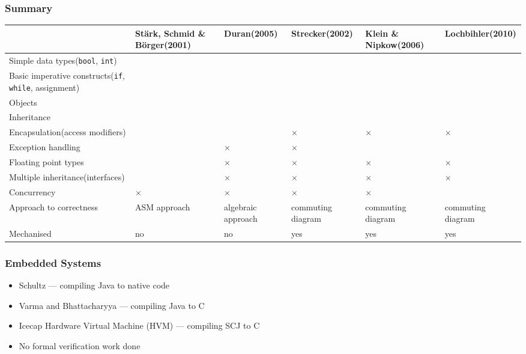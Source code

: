 \documentclass[usenames,dvipsnames,svgnames,table]{beamer}
\newcommand{\yes}{{\large \checkmark}}
\newcommand{\no}{{\large \color{red} $\times$}}
\newcommand{\footmake}[1]{
\ifthenelse{\equal{#1}{}}%
	{}%
	{\footnotetext{#1}}%
}
\newenvironment{slide}[2][fragile,environment=slide]
{\begin{frame}[#1]
	\frametitle{#2}\begin{refsegment}}
{\footmake{\printbibliography[segment=\therefsegment]}\end{refsegment}\end{frame}}
\begin{document}
\begin{frame}
  \frametitle{Summary}
  \tiny
  \begin{tabular}{p{2.6cm}| b{1.6cm} b{0.9cm} b{0.9cm} b{0.9cm} b{1cm}}
      & St\"{a}rk, Schmid \& B\"{o}rger\newline(2001) %
      & Duran\newline(2005) %
      & Strecker\newline(2002) %
      & Klein \& Nipkow\newline(2006) %
      & Lochbihler\newline(2010) %
      \\
      \hline
      Simple data types\newline(\texttt{bool}, \texttt{int})
      & \yes & \yes & \yes & \yes & \yes \\
      Basic imperative constructs\newline(\texttt{if}, \texttt{while}, assignment)
      & \yes & \yes & \yes & \yes & \yes \\
      Objects
      & \yes & \yes & \yes & \yes & \yes \\
      Inheritance
      & \yes & \yes & \yes & \yes & \yes  \\
      Encapsulation\newline(access modifiers)
      & \yes & \yes & \no  & \no  & \no  \\
      Exception handling
      & \yes & \no  & \no  & \yes & \yes \\
      Floating point types
      & \yes & \no  & \no  & \no  & \no  \\
      Multiple inheritance\newline(interfaces)
      & \yes & \no  & \no  & \no  & \no  \\
      Concurrency
      & \no  & \no  & \no  & \no  & \yes \\
      Approach to correctness
      & ASM approach & algebraic approach & commuting diagram & commuting diagram & commuting diagram \\
      Mechanised
      & no   & no   & yes  & yes  & yes  \\
  \end{tabular}
\end{frame}

\begin{slide}{Embedded Systems}
  \begin{itemize}
  \item Schultz\cite{schultz2003} --- compiling Java to native code
  \item Varma and Bhattacharyya\cite{varma2004} --- compiling Java to C
  \item Icecap Hardware Virtual Machine (HVM)\cite{sondergaard2012, korsholm2014} --- compiling SCJ to C
  \item No formal verification work done
  \end{itemize}
\end{slide}
\end{document}
